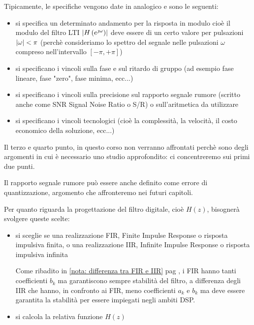 Tipicamente, le specifiche vengono date in analogico e sono le seguenti: 

\begin{itemize}
    \item si specifica un determinato andamento per la risposta in modulo cioè il modulo del filtro LTI $\abs{H \left(e^{\jmath \omega}\right)}$ deve essere di un certo valore per pulsazioni $\abs{\omega} < \pi$ (perchè consideriamo lo spettro del segnale nelle pulsazioni $\omega$ compreso nell'intervallo $\left[ - \pi, + \pi\right]$) 
    \item si specificano i vincoli sulla fase e sul ritardo di gruppo (ad esempio fase lineare, fase "zero", fase minima, ecc...)
    \item si specificano i vincoli sulla precisione sul rapporto segnale rumore (scritto anche come SNR Signal Noise Ratio o S/R) o sull'aritmetica da utilizzare 
    \item si specificano i vincoli tecnologici (cioè la complessità, la velocità, il costo economico della soluzione, ecc...)
\end{itemize}

\newpage 

\begin{tcolorbox}
    Il terzo e quarto punto, in questo corso non verranno affrontati perchè sono degli argomenti in cui è necessario uno studio approfondito: 
    ci concentreremo sui primi due punti. \newline 

    Il rapporto segnale rumore può essere anche definito come errore di quantizzazione, argomento che affronteremo nei futuri capitoli. 
\end{tcolorbox}

Per quanto riguarda la progettazione del filtro digitale, cioè $H \left(z\right)$, bisognerà svolgere queste scelte: 

\begin{itemize}
    \item si sceglie se una realizzazione FIR, Finite Impulse Response o risposta impulsiva finita, o una realizzazione IIR, Infinite Impulse Response o risposta impulsiva infinita 
    \begin{tcolorbox}
        Come ribadito in \ref{nota: differenza tra FIR e IIR}  pag \pageref{nota: differenza tra FIR e IIR}, 
        i FIR hanno tanti coefficienti $b_k$ ma garantiscono sempre stabilità del filtro, a differenza degli IIR che hanno, in confronto ai FIR, meno coefficienti $a_k$ e $b_k$ ma deve essere garantita la stabilità per essere impiegati negli ambiti DSP. 
    \end{tcolorbox}

    \item si calcola la relativa funzione $H \left(z\right)$
\end{itemize}


